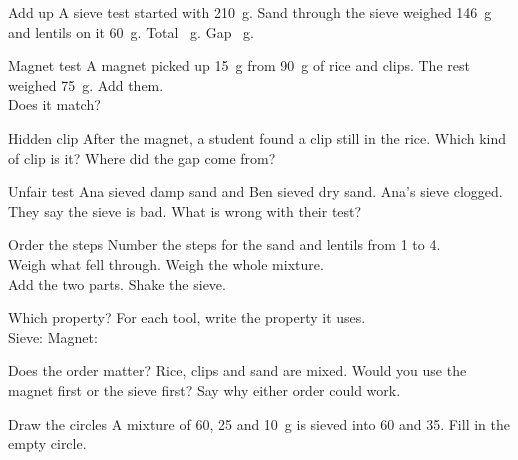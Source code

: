 \begin{puzzle}{Add up}
A sieve test started with 210~g. Sand through the sieve weighed 146~g and lentils on it 60~g. Total \wline[1.6cm]~g. Gap \wline[1.6cm]~g.
\end{puzzle}

\begin{puzzle}{Magnet test}
A magnet picked up 15~g from 90~g of rice and clips. The rest weighed 75~g. Add them. \wline[1.6cm]\\
Does it match? \wline[2cm]
\end{puzzle}

\begin{puzzle}{Hidden clip}
After the magnet, a student found a clip still in the rice. Which kind of clip is it? \wline[4cm] Where did the gap come from? \wline[4cm]
\end{puzzle}

\begin{puzzle}{Unfair test}
Ana sieved damp sand and Ben sieved dry sand. Ana's sieve clogged. They say the sieve is bad. What is wrong with their test? \wline[6cm]
\end{puzzle}

\clearpage

\begin{puzzle}{Order the steps}
Number the steps for the sand and lentils from 1 to 4.\\
\wline[1cm] Weigh what fell through. \quad \wline[1cm] Weigh the whole mixture.\\
\wline[1cm] Add the two parts. \quad \wline[1cm] Shake the sieve.
\end{puzzle}

\begin{puzzle}{Which property?}
For each tool, write the property it uses.\\
Sieve: \wline[3cm] \quad Magnet: \wline[3cm]
\end{puzzle}

\begin{puzzle}{Does the order matter?}
Rice, clips and sand are mixed. Would you use the magnet first or the sieve first? Say why either order could work. \wline[6cm]
\end{puzzle}

\begin{puzzle}{Draw the circles}
A mixture of 60, 25 and 10~g is sieved into 60 and 35. Fill in the empty circle.
\begin{center}
\end{center}
\end{puzzle}

